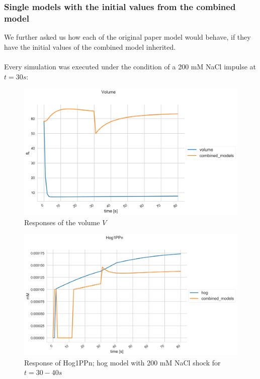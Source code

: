 \subsubsection{Single models with the initial values from the combined model}
We further asked us how each of the original paper model would behave, if they have the initial values of the combined model inherited.\\\\
Every simulation was executed under the condition of a 200 mM NaCl impulse at $t=30s$:\\
\begin{figure}[h!]
	\begin{center}
		\begin{minipage}{0,8\textwidth}
			
			\includegraphics[width=\textwidth]{picture/r_71.png}
			\caption{Responses of the volume $V$} 
			\label{CombiInitVolume} 
		\end{minipage}
	\end{center}
\end{figure}
\begin{figure}[h!]
	\begin{center}
		\begin{minipage}{0,8\textwidth}
			
			\includegraphics[width=\textwidth]{picture/Hog1PPn_71.png}
			\caption{Response of Hog1PPn; hog model with 200 mM NaCl shock for $t=30-40s$} 
			\label{CombiInitHog} 
		\end{minipage}
	\end{center}
\end{figure}
